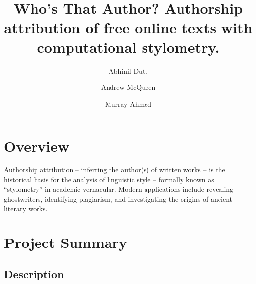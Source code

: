 \documentclass[sigconf, nonacm]{acmart}
\begin{document}
\title{Who's That Author? Authorship attribution of free online texts with computational stylometry.}

\author{Abhinil Dutt}

\author{Andrew McQueen}
\authornotemark[1]

\author{Murray Ahmed}
\authornotemark[1]



\maketitle

\section{Overview}
Authorship attribution -- inferring the author(s) of written works -- is the historical basis
for the analysis of linguistic style -- formally known as “stylometry” in academic vernacular. 
Modern applications include revealing ghostwriters, identifying plagiarism, 
and investigating the origins of ancient literary works. 







\section{Project Summary}

\subsection{Description}
\end{document}
